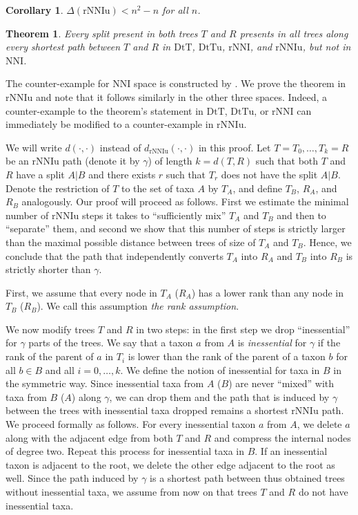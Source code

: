 \documentclass{amsart}
\newtheorem{corollary}[lemma]{Corollary}
\newtheorem{theorem}[lemma]{Theorem}
\theoremstyle{definition}
\newcommand{\nni}{\mathrm{NNI}}
\newcommand{\rnni}{\mathrm{rNNI}}
\newcommand{\rnniu}{\mathrm{rNNIu}}
\newcommand{\mdts}{\mathrm{DtT}}
\newcommand{\mdtsu}{\mathrm{DtTu}}
\begin{document}
\begin{corollary}\label{diameterUpperBoundCoro}
$\Delta(\rnniu) < n^2 - n$ for all $n$.
\end{corollary}

\begin{theorem}\label{splitTheo}
Every split present in both trees $T$ and $R$ presents in all trees along every shortest path between $T$ and $R$ in $\mdts$, $\mdtsu$, $\rnni$, and $\rnniu$, but not in $\nni$.
\end{theorem}

\proof
The counter-example for $\nni$ space is constructed by \textcite{li1996some}.
We prove the theorem in $\rnniu$ and note that it follows similarly in the other three spaces.
Indeed, a counter-example to the theorem's statement in $\mdts$, $\mdtsu$, or $\rnni$ can immediately be modified to a counter-example in $\rnniu$.

We will write $d(\cdot, \cdot)$ instead of $d_\rnniu(\cdot, \cdot)$ in this proof.
Let $T = T_0, \ldots, T_k = R$ be an $\rnniu$ path (denote it by $\gamma$) of length $k = d(T, R)$ such that both $T$ and $R$ have a split $A|B$ and there exists $r$ such that $T_r$ does not have the split $A|B$.
Denote the restriction of $T$ to the set of taxa $A$ by $T_A$, and define $T_B$, $R_A$, and $R_B$ analogously.
Our proof will proceed as follows.
First we estimate the minimal number of $\rnniu$ steps it takes to ``sufficiently mix'' $T_A$ and $T_B$ and then to ``separate'' them, and second we show that this number of steps is strictly larger than the maximal possible distance between trees of size of $T_A$ and $T_B$.
Hence, we conclude that the path that independently converts $T_A$ into $R_A$ and $T_B$ into $R_B$ is strictly shorter than $\gamma$.

First, we assume that every node in $T_A$ ($R_A$) has a lower rank than any node in $T_B$ ($R_B$).
We call this assumption {\em the rank assumption}.

We now modify trees $T$ and $R$ in two steps: in the first step we drop ``inessential'' for $\gamma$ parts of the trees.
We say that a taxon $a$ from $A$ is {\em inessential} for $\gamma$ if the rank of the parent of $a$ in $T_i$ is lower than the rank of the parent of a taxon $b$ for all $b \in B$ and all $i = 0,\ldots,k$.
We define the notion of inessential for taxa in $B$ in the symmetric way.
Since inessential taxa from $A$ ($B$) are never ``mixed'' with taxa from $B$ ($A$) along $\gamma$, we can drop them and the path that is induced by $\gamma$ between the trees with inessential taxa dropped remains a shortest $\rnniu$ path.
We proceed formally as follows.
For every inessential taxon $a$ from $A$, we delete $a$ along with the adjacent edge from both $T$ and $R$ and compress the internal nodes of degree two.
Repeat this process for inessential taxa in $B$.
If an inessential taxon is adjacent to the root, we delete the other edge adjacent to the root as well.
Since the path induced by $\gamma$ is a shortest path between thus obtained trees without inessential taxa, we assume from now on that trees $T$ and $R$ do not have inessential taxa.
\end{document}
